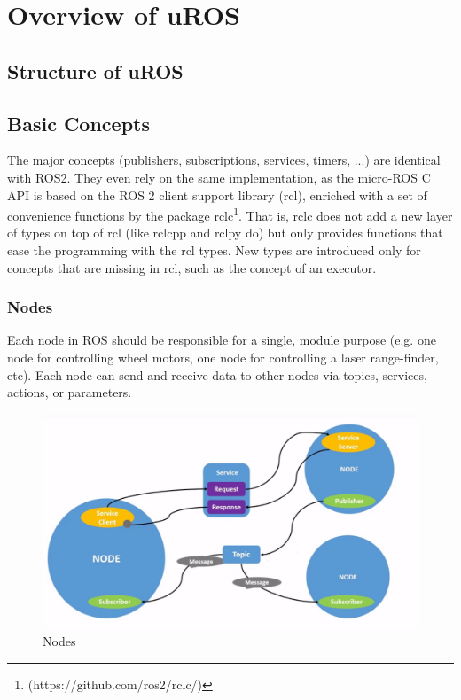 \chapter{Overview of uROS}
\section{Structure of uROS}

\section{Basic Concepts}
The major concepts (publishers, subscriptions, services, timers, ...) are identical with ROS2. They even rely on the same implementation, as the micro-ROS C API is based on the ROS 2 client support library (rcl), enriched with a set of convenience functions by the package rclc\footnote{(https://github.com/ros2/rclc/)}. That is, rclc does not add a new layer of types on top of rcl (like rclcpp and rclpy do) but only provides functions that ease the programming with the rcl types. New types are introduced only for concepts that are missing in rcl, such as the concept of an executor.

\subsection{Nodes}
Each node in ROS should be responsible for a single, module purpose (e.g. one node for controlling wheel motors, one node for controlling a laser range-finder, etc). Each node can send and receive data to other nodes via topics, services, actions, or parameters.
\begin{figure}[htb!]
    \centering
    \includegraphics[width=0.75\linewidth]{Img/node.jpg}
    \caption{Nodes}\label{f:node}
    \vspace{-0.1in}
\end{figure}

